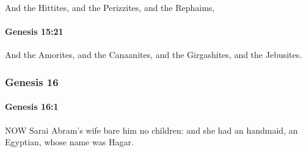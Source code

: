 			And the Hittites, and the Perizzites, and the Rephaims,


		\paragraph{Genesis 15:21} %
			\label{GENESIS-15-21}

			And the Amorites, and the Canaanites, and the Girgashites, and the Jebusites.


	\subsubsection{Genesis 16} %
		\label{GENESIS-16}
		
		\paragraph{Genesis 16:1} %
			\label{GENESIS-16-1}

			NOW Sarai Abram's wife bare him no children: and she had an handmaid, an Egyptian, whose name was Hagar.


